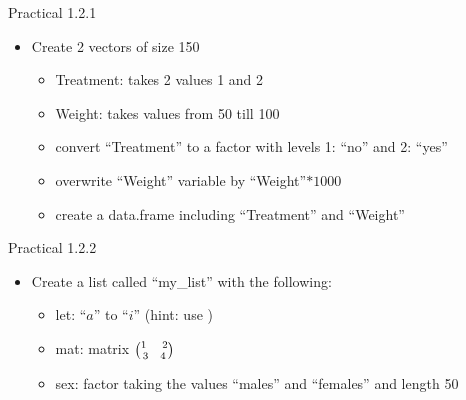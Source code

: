 \documentclass[14pt, aspectratio=169, sectionpage=simple, xclolor=table]{beamer}
\begin{document}
\begin{frame}{Practical 1.2.1 }
\begin{itemize}
\item Create 2 vectors of size 150
\begin{itemize}
\item Treatment: takes 2 values 1 and 2
\item Weight: takes values from 50 till 100
\item convert \enquote{Treatment} to a factor with levels 1: \enquote{no} and 2: \enquote{yes}
\item overwrite \enquote{Weight} variable by \enquote{Weight}$*1000$
\item create a data.frame including \enquote{Treatment} and \enquote{Weight}
\end{itemize}
\end{itemize}
\end{frame}

\begin{frame}{Practical 1.2.2 }
\begin{itemize}
\item Create a list called \enquote{my\_list} with the following:
\begin{itemize}
\item let: \enquote{$a$} to \enquote{$i$} (hint: use )
\item mat: matrix $\binom{1\hspace{0.4cm}2}{3\hspace{0.3cm}4}$
\item sex: factor taking the values \enquote{males} and \enquote{females} and length 50
\end{itemize}
\end{itemize}
\end{frame}
\end{document}
